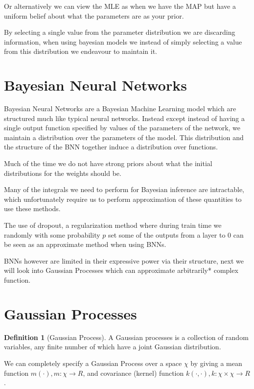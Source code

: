 \documentclass[12pt, a4paper]{report}
\theoremstyle{definition}
\theoremstyle{definition}
\newtheorem{definition}{Definition}[section]
\theoremstyle{definition}
\begin{document}
Or alternatively we can view the MLE as when we have the MAP but have a uniform belief about what the parameters are as your prior.

By selecting a single value from the parameter distribution we are discarding information, when using bayesian models we instead of simply selecting a value from this distribution we endeavour to maintain it.


\section{Bayesian Neural Networks}
\label{sec:BNNs}


Bayesian Neural Networks are a Bayesian Machine Learning model which are structured much like typical neural networks. Instead except instead of having a single output function specified by values of the parameters of the network, we maintain a distribution over the parameters of the model. This distribution and the structure of the BNN together induce a distribution over functions.

Much of the time we do not have strong priors about what the initial distributions for the weights should be.

Many of the integrals we need to perform for Bayesian inference are intractable, which unfortunately require us to perform approximation of these quantities to use these methods.

The use of dropout, a regularization method where during train time we randomly with some probability $p$ set some of the outputs from a layer to 0 can be seen as an approximate method when using BNNs. \cite{gal2016dropout}

BNNs however are limited in their expressive power via their structure, next we will look into Gaussian Processes which can approximate arbitrarily* complex function.

\section{Gaussian Processes}
\label{sec:GaussianProcesses}


\begin{definition}[Gaussian Process]
    A Gaussian processes is a collection of random variables, any finite number of which have a joint Gaussian distribution. \cite{rasmussen2003gaussian}
\end{definition}


We can completely specify a Gaussian Process over a space $\chi$ by giving a mean function $m(\cdot), m : \chi \rightarrow R$, and covariance (kernel) function $k(\cdot, \cdot), k: \chi \times \chi \rightarrow R$.
\end{document}
